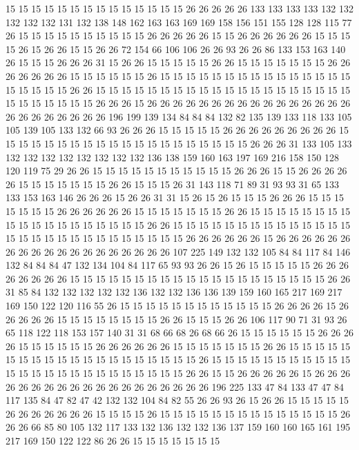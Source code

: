 15 15 15 15 15 15 15 15 15 15 15 15 15 15 26 26 26 26 26 133
133 133 133 132 132 132 132 132 131 132 138 148 162 163 163 169 169 158 156 151
155 128 128 115 77 26 15 15 15 15 15 15 15 15 15 15 26 26 26 26
26 15 15 26 26 26 26 26 26 15 15 15 15 26 15 26 26 15 15 26
26 72 154 66 106 106 26 26 93 26 26 86 133 153 163 140 26 15 15 15
26 26 26 31 15 26 26 15 15 15 15 15 26 26 15 15 15 15 15 15
15 26 26 26 26 26 26 26 15 15 15 15 15 15 26 15 15 15 15 15
15 15 15 15 15 15 15 15 15 15 15 15 15 15 15 26 26 15 15 15
15 15 15 15 15 15 15 15 15 15 15 15 15 15 15 15 15 15 15 15
15 15 15 15 26 26 26 15 26 26 26 26 26 26 26 26 26 26 26 26
26 26 26 26 26 26 26 26 26 26 26 26 196 199 139 134 84 84 84 132
82 135 139 133 118 133 105 105 139 105 133 132 66 93 26 26 26 15 15 15
15 15 26 26 26 26 26 26 26 26 26 15 15 15 15 15 15 15 15 15
15 15 15 15 15 15 15 15 15 15 15 26 26 26 31 133 105 133 132 132
132 132 132 132 132 132 136 138 159 160 163 197 169 216 158 150 128 120 119 75
29 26 26 15 15 15 15 15 15 15 15 15 15 15 26 26 26 15 15 26
26 26 26 26 15 15 15 15 15 15 15 26 26 15 15 15 26 31 143 118
71 89 31 93 93 31 65 133 133 153 163 146 26 26 26 15 26 26 31 31
15 26 15 26 15 15 15 26 26 26 15 15 15 15 15 15 15 26 26 26
26 26 26 15 15 15 15 15 15 15 26 26 15 15 15 15 15 15 15 15
15 15 15 15 15 15 15 15 15 15 15 26 26 15 15 15 15 15 15 15
15 15 15 15 15 15 15 15 15 15 15 15 15 15 15 15 15 15 15 15
15 26 26 26 26 26 26 15 26 26 26 26 26 26 26 26 26 26 26 26
26 26 26 26 26 26 26 107 225 149 132 132 105 84 84 117 84 146 132 84
84 84 47 132 134 104 84 117 65 93 93 26 26 15 26 15 15 15 15 15
26 26 26 26 26 26 26 26 15 15 15 15 15 15 15 15 15 15 15 15
15 15 15 15 15 15 15 15 26 26 31 85 84 132 132 132 132 132 136 132
132 136 136 139 159 160 165 217 169 217 169 150 122 120 116 55 26 15 15 15
15 15 15 15 15 15 15 15 15 26 26 26 26 15 26 26 26 26 26 15
15 15 15 15 15 15 15 26 26 15 15 15 26 26 106 117 90 71 31 93
26 65 118 122 118 153 157 140 31 31 68 66 68 26 68 66 26 15 15 15
15 15 15 26 26 26 26 15 15 15 15 15 15 26 26 26 26 26 26 15
15 15 15 15 15 15 26 26 15 15 15 15 15 15 15 15 15 15 15 15
15 15 15 15 15 15 15 15 26 15 15 15 15 15 15 15 15 15 15 15
15 15 15 15 15 15 15 15 15 15 15 15 15 15 26 26 15 15 26 26
26 26 26 15 26 26 26 26 26 26 26 26 26 26 26 26 26 26 26 26
26 26 26 196 225 133 47 84 133 47 47 84 117 135 84 47 82 47 42 132
132 104 84 82 55 26 26 93 26 15 26 26 15 15 15 15 15 26 26 26
26 26 26 26 15 15 15 15 26 15 15 15 15 15 15 15 15 15 15 15
15 15 15 26 26 26 66 85 80 105 132 117 133 132 136 132 132 136 137 159
160 160 165 161 195 217 169 150 122 122 86 26 26 15 15 15 15 15 15 15
